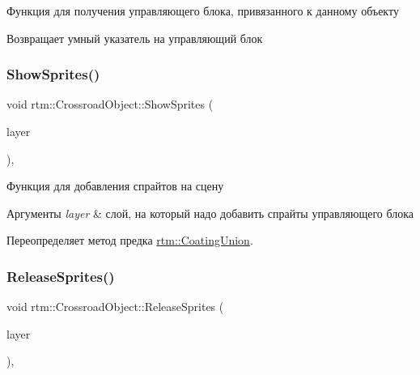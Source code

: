 Функция для получения управляющего блока, привязанного к данному объекту 

\begin{DoxyReturn}{Возвращает}
умный указатель на управляющий блок 
\end{DoxyReturn}
\mbox{\label{classrtm_1_1_crossroad_object_a2de2a5dac2ba2ca573cfa65a2633de9b}} 
\subsubsection{\texorpdfstring{Show\+Sprites()}{ShowSprites()}}
{\footnotesize\ttfamily void rtm\+::\+Crossroad\+Object\+::\+Show\+Sprites (\begin{DoxyParamCaption}\item[{cocos2d\+::\+Layer $\ast$const}]{layer }\end{DoxyParamCaption})\hspace{0.3cm}{\ttfamily [override]}, {\ttfamily [virtual]}}



Функция для добавления спрайтов на сцену 


\begin{DoxyParams}{Аргументы}
{\em layer} & слой, на который надо добавить спрайты управляющего блока \\
\hline
\end{DoxyParams}


Переопределяет метод предка \hyperlink{classrtm_1_1_coating_union_ae95be187677aec759723edb4d14b35c1}{rtm\+::\+Coating\+Union}.

\mbox{\label{classrtm_1_1_crossroad_object_a92e9357697edecc69564fd4d40524a3b}} 
\subsubsection{\texorpdfstring{Release\+Sprites()}{ReleaseSprites()}}
{\footnotesize\ttfamily void rtm\+::\+Crossroad\+Object\+::\+Release\+Sprites (\begin{DoxyParamCaption}\item[{cocos2d\+::\+Layer $\ast$const}]{layer }\end{DoxyParamCaption})\hspace{0.3cm}{\ttfamily [override]}, {\ttfamily [virtual]}}



